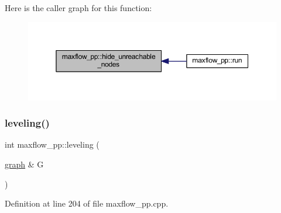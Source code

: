 Here is the caller graph for this function\+:\nopagebreak
\begin{figure}[H]
\begin{center}
\leavevmode
\includegraphics[width=350pt]{classmaxflow__pp_a93bb037fd3fc83c6558b560fc4da2340_icgraph}
\end{center}
\end{figure}
\mbox{\label{classmaxflow__pp_adefb2cdc0145d57efd2d93c17a180896}} 
\subsubsection{\texorpdfstring{leveling()}{leveling()}}
{\footnotesize\ttfamily int maxflow\+\_\+pp\+::leveling (\begin{DoxyParamCaption}\item[{\mbox{\hyperlink{classgraph}{graph}} \&}]{G }\end{DoxyParamCaption})\hspace{0.3cm}{\ttfamily [protected]}}



Definition at line 204 of file maxflow\+\_\+pp.\+cpp.


